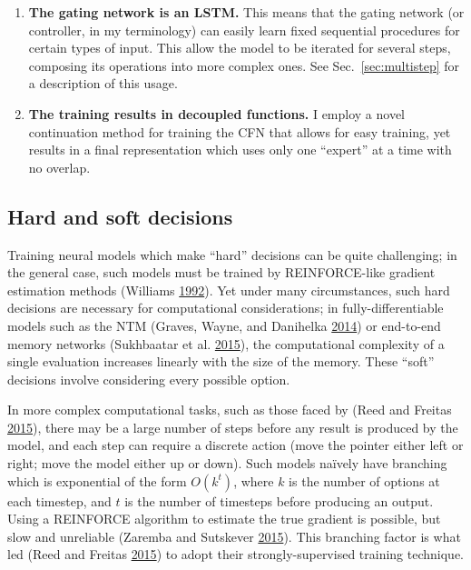 \documentclass[12pt,twoside]{mitthesis}
\providecommand{\tightlist}{%
  \setlength{\itemsep}{0pt}\setlength{\parskip}{0pt}}
\begin{document}
\begin{enumerate}
\def\labelenumi{\arabic{enumi}.}
\tightlist
\item
  \textbf{The gating network is an LSTM.} This means that the gating
  network (or controller, in my terminology) can easily learn fixed
  sequential procedures for certain types of input. This allow the model
  to be iterated for several steps, composing its operations into more
  complex ones. See Sec.~\ref{sec:multistep} for a description of this
  usage.
\item
  \textbf{The training results in decoupled functions.} I employ a novel
  continuation method for training the CFN that allows for easy
  training, yet results in a final representation which uses only one
  ``expert'' at a time with no overlap.
\end{enumerate}

\subsection{Hard and soft decisions}\label{hard-and-soft-decisions}

Training neural models which make ``hard'' decisions can be quite
challenging; in the general case, such models must be trained by
REINFORCE-like gradient estimation methods (Williams
\protect\hyperlink{ref-williams1992simple}{1992}). Yet under many
circumstances, such hard decisions are necessary for computational
considerations; in fully-differentiable models such as the NTM (Graves,
Wayne, and Danihelka \protect\hyperlink{ref-graves2014neural}{2014}) or
end-to-end memory networks (Sukhbaatar et al.
\protect\hyperlink{ref-sukhbaatar2015end}{2015}), the computational
complexity of a single evaluation increases linearly with the size of
the memory. These ``soft'' decisions involve considering every possible
option.

In more complex computational tasks, such as those faced by (Reed and
Freitas \protect\hyperlink{ref-reed2015neural}{2015}), there may be a
large number of steps before any result is produced by the model, and
each step can require a discrete action (move the pointer either left or
right; move the model either up or down). Such models naïvely have
branching which is exponential of the form \(O(k^t)\), where \(k\) is
the number of options at each timestep, and \(t\) is the number of
timesteps before producing an output. Using a REINFORCE algorithm to
estimate the true gradient is possible, but slow and unreliable (Zaremba
and Sutskever \protect\hyperlink{ref-zaremba2015reinforcement}{2015}).
This branching factor is what led (Reed and Freitas
\protect\hyperlink{ref-reed2015neural}{2015}) to adopt their
strongly-supervised training technique.
\end{document}
